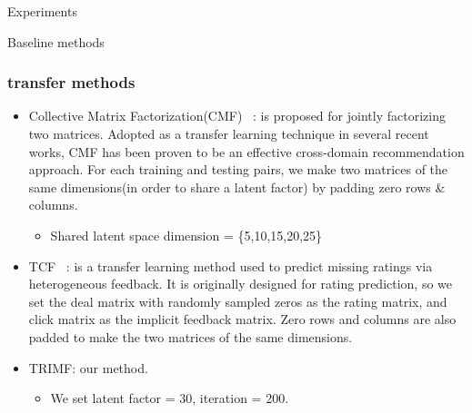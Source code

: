 \begin{section}{Experiments}
\begin{subsection}{Baseline methods}
{\subsubsection{transfer methods}
\begin{itemize}
    \item Collective Matrix Factorization(CMF) ~\cite{/kdd/SinghG08}: is proposed for jointly factorizing two matrices. Adopted as a transfer
learning technique in several recent works, CMF has been proven to be an effective cross-domain recommendation approach. For each training and testing pairs, we make two matrices of the same dimensions(in order to share a latent factor) by padding zero rows \& columns.
      \begin{itemize}
      \item Shared latent space dimension = \{5,10,15,20,25\}
      \end{itemize}
    \item TCF ~\cite{/ijcai/PanLXY11}: is a transfer learning method used to predict missing ratings via heterogeneous feedback. It is originally designed for rating prediction, so we set the deal matrix with randomly sampled zeros as the rating matrix, and click matrix as the implicit feedback matrix. Zero rows and columns are also padded to make the two matrices of the same dimensions.
\item TRIMF: our method.
  \begin{itemize}
  \item We set latent factor = 30, iteration = 200.
  \end{itemize}
    \end{itemize}
  
}
\end{subsection}
\end{section}
